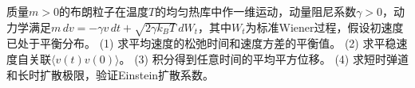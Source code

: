 质量\(m>0\)的布朗粒子在温度\(T\)的均匀热库中作一维运动，动量阻尼系数\(\gamma>0\)，动力学满足\(m\,dv=-\gamma v\,dt+\sqrt{2\gamma k_BT}\,dW_t\)，其中\(W_t\)为标准Wiener过程，假设初速度已处于平衡分布。
(1) 求平均速度的松弛时间和速度方差的平衡值。
(2) 求平稳速度自关联\(\langle v(t)v(0)\rangle\)。
(3) 积分得到任意时间的平均平方位移。
(4) 求短时弹道和长时扩散极限，验证Einstein扩散系数。
